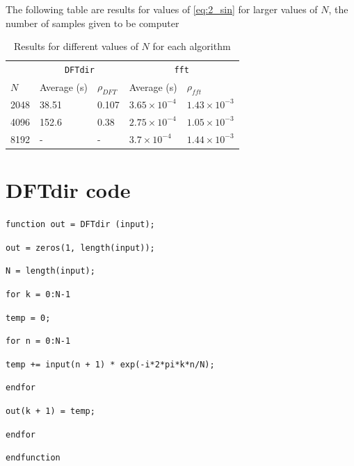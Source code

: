 \documentclass[a4paper, 12pt]{report}
\begin{document}
			The following table are results for values of \eqref{eq:2_sin} for larger values of $N$, the number of samples given to be computer
			\begin{table}[H]
				\begin{tabularx}{\textwidth}{X X X X X}
					\toprule
					& \multicolumn{2}{c}{\texttt{DFTdir}} & \multicolumn{2}{c}{\texttt{fft}} \\
					$N$ & Average (s) & $\rho_{DFT}$ & Average (s) & $\rho_{fft}$ \\
					\midrule
					2048 & 38.51 & 0.107 & $3.65 \times 10^{-4}$ & $1.43 \times 10^{-3}$ \\
					4096 & 152.6 & 0.38 & $2.75 \times 10^{-4}$ & $1.05 \times 10^{-3}$ \\
					8192 & - & - & $3.7 \times 10^{-4}$ & $1.44 \times 10^{-3}$ \\
					\bottomrule
				\end{tabularx}
				\caption{Results for different values of $N$ for each algorithm}
			\end{table}

	\appendix
	\chapter{DFTdir code} %
	\label{sec:dftdir_code}
		\texttt{function out = DFTdir (input);}\par
		\texttt{out = zeros(1, length(input));}\par
		\indent\texttt{N = length(input);}\par
		\texttt{for k = 0:N-1}\par
		\hspace*{2em}\texttt{temp = 0;}\par
		\hspace*{2em}\texttt{for n = 0:N-1}\par
		\hspace*{4em}\texttt{temp += input(n + 1) * exp(-i*2*pi*k*n/N);}\par
		\hspace*{2em}\texttt{endfor}\par
		\hspace*{2em}\texttt{out(k + 1) = temp;}\par
		\texttt{endfor}\par
		\noindent\texttt{endfunction}\par
\end{document}
